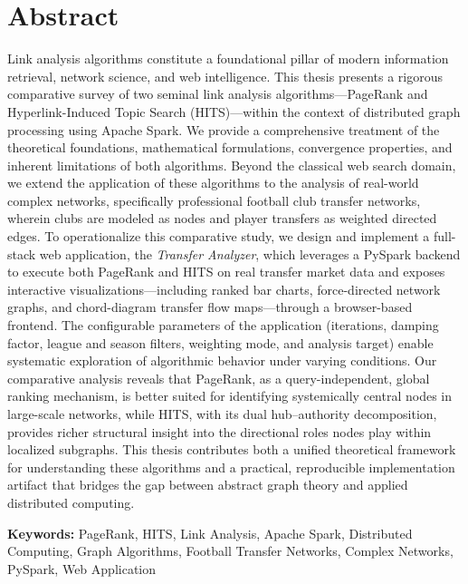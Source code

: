 \chapter*{Abstract}

Link analysis algorithms constitute a foundational pillar of modern information retrieval, network science, and web intelligence. This thesis presents a rigorous comparative survey of two seminal link analysis algorithms---PageRank and Hyperlink-Induced Topic Search (HITS)---within the context of distributed graph processing using Apache Spark. We provide a comprehensive treatment of the theoretical foundations, mathematical formulations, convergence properties, and inherent limitations of both algorithms. Beyond the classical web search domain, we extend the application of these algorithms to the analysis of real-world complex networks, specifically professional football club transfer networks, wherein clubs are modeled as nodes and player transfers as weighted directed edges. To operationalize this comparative study, we design and implement a full-stack web application, the \textit{Transfer Analyzer}, which leverages a PySpark backend to execute both PageRank and HITS on real transfer market data and exposes interactive visualizations---including ranked bar charts, force-directed network graphs, and chord-diagram transfer flow maps---through a browser-based frontend. The configurable parameters of the application (iterations, damping factor, league and season filters, weighting mode, and analysis target) enable systematic exploration of algorithmic behavior under varying conditions. Our comparative analysis reveals that PageRank, as a query-independent, global ranking mechanism, is better suited for identifying systemically central nodes in large-scale networks, while HITS, with its dual hub--authority decomposition, provides richer structural insight into the directional roles nodes play within localized subgraphs. This thesis contributes both a unified theoretical framework for understanding these algorithms and a practical, reproducible implementation artifact that bridges the gap between abstract graph theory and applied distributed computing.

\vspace{1em}
\noindent\textbf{Keywords:} PageRank, HITS, Link Analysis, Apache Spark, Distributed Computing, Graph Algorithms, Football Transfer Networks, Complex Networks, PySpark, Web Application